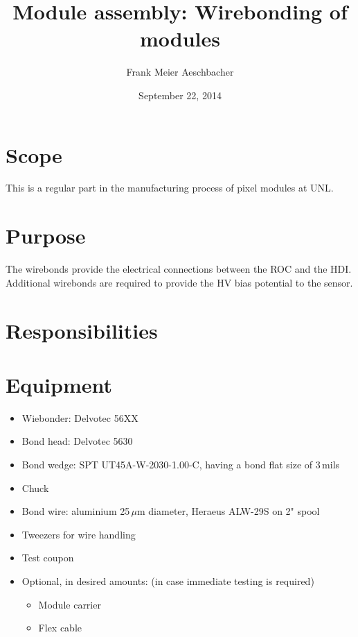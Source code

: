 \documentclass[12pt]{unlsilabsop}
\title{Module assembly: Wirebonding of modules}
\date{September 22, 2014}
\author{Frank Meier Aeschbacher}
\begin{document}
\maketitle

\section{Scope}
This is a regular part in the manufacturing process of pixel modules at UNL.

\section{Purpose}
The wirebonds provide the electrical connections between the ROC and the HDI. Additional wirebonds are required to provide the HV bias potential to the sensor.


\section{Responsibilities}

\section{Equipment}

\begin{itemize}
    \item Wiebonder: Delvotec 56XX
    \item Bond head: Delvotec 5630
    \item Bond wedge: SPT UT45A-W-2030-1.00-C, having a bond flat size of 3\,mils
    \item Chuck
    \item Bond wire: aluminium 25\,$\mu$m diameter, Heraeus ALW-29S on 2" spool
    \item Tweezers for wire handling
    \item Test coupon
    \item Optional, in desired amounts: (in case immediate testing is required)
    \begin{itemize}
	\item Module carrier
	\item Flex cable
    \end{itemize}
\end{itemize}
\end{document}
